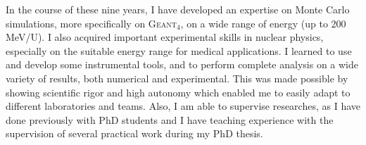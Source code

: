 \documentclass[11pt,a4paper,sans]{moderncv}        %
\begin{document}
In the course of these nine years, I have developed an expertise on Monte Carlo simulations, more specifically on G\textsc{eant}$_4$, on a wide range of energy (up to 200 MeV/U).
I also acquired important experimental skills in nuclear physics, especially on the suitable energy range for medical applications.
I learned to use and develop some instrumental tools, and to perform complete analysis on a wide variety of results, both numerical and experimental. 
This was made possible by showing scientific rigor and high autonomy which enabled me to easily adapt to different laboratories and teams.
Also, I am able to supervise researches, as I have done previously with PhD students and I have teaching experience with the supervision of several practical work during my PhD thesis.

\makeletterclosing
\end{document}
